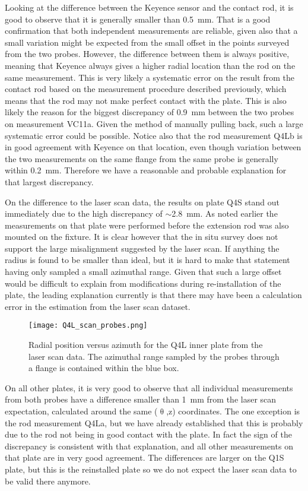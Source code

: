 Looking at the difference between the Keyence sensor and the contact rod, it is good to observe that it is generally smaller than \SI{0.5}{mm}. That is a good confirmation that both independent measurements are reliable, given also that a small variation might be expected from the small offset in the points surveyed from the two probes.
However, the difference between them is always positive, meaning that Keyence always gives a higher radial location than the rod on the same measurement. This is very likely a systematic error on the result from the contact rod based on the measurement procedure described previously, which means that the rod may not make perfect contact with the plate. 
This is also likely the reason for the biggest discrepancy of \SI{0.9}{mm} between the two probes on measurement VC11a. Given the method of manually pulling back, such a large systematic error could be possible. Notice also that the rod measurement Q4Lb is in good agreement with Keyence on that location, even though variation between the two measurements on the same flange from the same probe is generally within \SI{0.2}{mm}.
Therefore we have a reasonable and probable explanation for that largest discrepancy.

On the difference to the laser scan data, the results on plate Q4S stand out immediately due to the high discrepancy of $\sim$\SI{2.8}{mm}. As noted earlier the measurements on that plate were performed before the extension rod was also mounted on the fixture.
It is clear however that the in situ survey does not support the large misalignment suggested by the laser scan. If anything the radius is found to be smaller than ideal, but it is hard to make that statement having only sampled a small azimuthal range.
Given that such a large offset would be difficult to explain from modifications during re-installation of the plate, the leading explanation currently is that there may have been a calculation error in the estimation from the laser scan dataset.



\begin{figure}[]
	\centering
	\texttt{[image: Q4L\_scan\_probes.png]}
	\caption{Radial position versus azimuth for the Q4L inner plate from the laser scan data. The azimuthal range sampled by the probes through a flange is contained within the blue box.
	}\label{fig:Q4L_scan_probes}
\end{figure}



On all other plates, it is very good to observe that all individual measurements from both probes have a difference smaller than \SI{1}{mm} from the laser scan expectation, calculated around the same ($\uptheta$,z) coordinates.
The one exception is the rod measurement Q4La, but we have already established that this is probably due to the rod not being in good contact with the plate. In fact the sign of the discrepancy is consistent with that explanation, and all other measurements on that plate are in very good agreement.
The differences are larger on the Q1S plate, but this is the reinstalled plate so we do not expect the laser scan data to be valid there anymore. 

